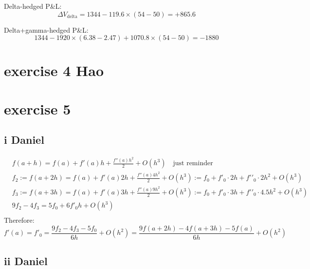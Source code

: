 \documentclass{article}
\begin{document}
Delta-hedged P\&L:
\[
\Delta V_{\text{delta}} = 1344 - 119.6 \times (54 - 50) = +865.6
\]

Delta+gamma-hedged P\&L:
\[
1344 - 1920\times(6.38-2.47) + 1070.8\times (54 - 50) = -1880
\]


\section{exercise 4 Hao}

\section{exercise 5}
\subsection{i Daniel}
\begin{align}
     & f\left( a+h \right) = f\left( a \right)+f'\left( a \right)h+\frac{f''\left( a \right){{h}^{2}}}{2}+O\left( {{h}^{3}} \right)\quad \text{just reminder}                                                                           \\
     & {{f}_{2}}:=f\left( a+2h \right) = f\left( a \right)+f'\left( a \right)2h+\frac{f''\left( a \right)4{{h}^{2}}}{2}+O\left( {{h}^{3}} \right):={{f}_{0}}+f{{'}_{0}}\cdot 2h+f'{{'}_{0}}\cdot 2{{h}^{2}}+O\left( {{h}^{3}} \right)   \\
     & {{f}_{3}}:=f\left( a+3h \right) = f\left( a \right)+f'\left( a \right)3h+\frac{f''\left( a \right)9{{h}^{2}}}{2}+O\left( {{h}^{3}} \right):={{f}_{0}}+f{{'}_{0}}\cdot 3h+f'{{'}_{0}}\cdot 4.5{{h}^{2}}+O\left( {{h}^{3}} \right) \\
     & 9{{f}_{2}}-4{{f}_{3}}=5{{f}_{0}}+6f{{'}_{0}}h+O\left( {{h}^{3}} \right)                                                                                                                                                          \\
\end{align}
Therefore:
\[f'\left( a \right)=f{{'}_{0}}=\frac{9{{f}_{2}}-4{{f}_{3}}-5{{f}_{0}}}{6h}+O\left( {{h}^{2}} \right)=\frac{9f\left( a+2h \right)-4f\left( a+3h \right)-5f\left( a \right)}{6h}+O\left( {{h}^{2}} \right)\]
\subsection{ii Daniel}
\end{document}

